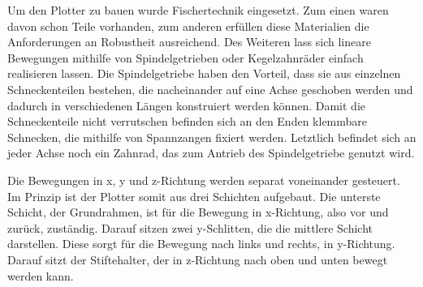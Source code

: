 \documentclass[conference,compsoc,final,a4paper]{IEEEtran}
\begin{document}
Um den Plotter zu bauen wurde Fischertechnik eingesetzt. Zum einen waren davon schon Teile vorhanden, zum anderen erfüllen diese Materialien die Anforderungen an Robustheit ausreichend. Des Weiteren lass sich lineare Bewegungen mithilfe von Spindelgetrieben oder Kegelzahnräder einfach realisieren lassen. 
Die Spindelgetriebe haben den Vorteil, dass sie aus einzelnen Schneckenteilen bestehen, die nacheinander auf eine Achse geschoben werden und dadurch in verschiedenen Längen konstruiert werden können. Damit die Schneckenteile nicht verrutschen befinden sich an den Enden klemmbare Schnecken, die mithilfe von Spannzangen fixiert werden. Letztlich befindet sich an jeder Achse noch ein Zahnrad, das zum Antrieb des Spindelgetriebe genutzt wird.

Die Bewegungen in x, y und z-Richtung werden separat voneinander gesteuert. Im Prinzip ist der Plotter somit aus drei Schichten aufgebaut. Die unterste Schicht, der Grundrahmen, ist für die Bewegung in x-Richtung, also vor und zurück, zuständig. Darauf sitzen zwei y-Schlitten, die die mittlere Schicht darstellen. Diese sorgt für die Bewegung nach links und rechts, in y-Richtung. Darauf sitzt der Stiftehalter, der in z-Richtung nach oben und unten bewegt werden kann.
\end{document}
